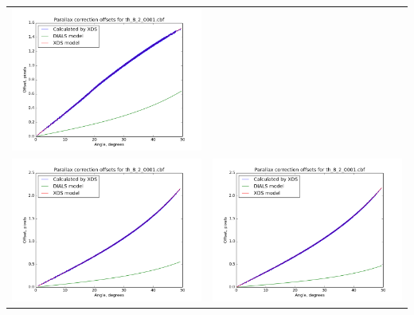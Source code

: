 \documentclass{article}
\begin{document}
{\begin{tabular}{cc}
\includegraphics[scale=0.3]{corrections14000.png} \\
\includegraphics[scale=0.3]{corrections16000.png} & 
\includegraphics[scale=0.3]{corrections18000.png} \\
\end{tabular}
}
\end{document}
